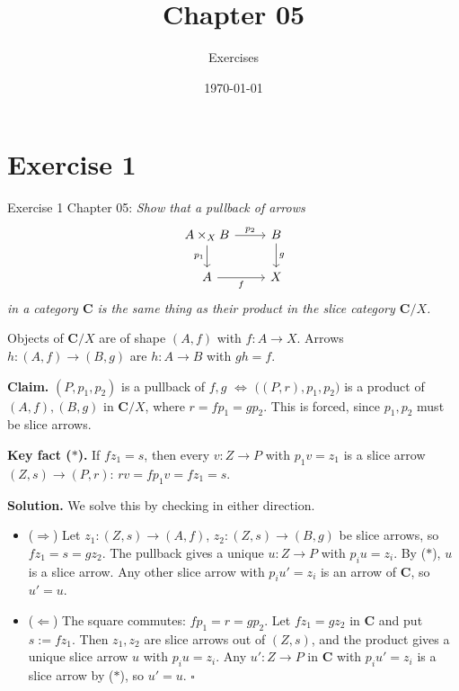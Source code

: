 \documentclass[11pt]{article}
\title{Chapter 05}
\author{Exercises}
\date{\today}
\begin{document}
\maketitle

\section{Exercise 1}

Exercise 1 Chapter 05: \textit{
  Show that a pullback of arrows
}
\[
\begin{tikzcd}
  A \times_{X} B \ar[r, "p_2"] \ar[d, "p_1"'] & B \ar[d, "g"] \\
  A \ar[r, "f"'] & X
\end{tikzcd}
\]
\textit{
in a category $\mathbf{C}$ is the same thing as their product in the slice
category $\mathbf{C}/X$.
}

\medskip

Objects of $\mathbf{C}/X$ are of shape $(A,f)$ with $f : A \to X$. Arrows
$h : (A,f) \to (B,g)$ are $h : A \to B$ with $g h = f$.

\textbf{Claim.} $(P,p_1,p_2)$ is a pullback of $f, g$ $\Leftrightarrow$
$\bigl((P,r),p_1,p_2\bigr)$ is a product of $(A,f), (B,g)$ in $\mathbf{C}/X$,
where $r = f p_1 = g p_2$. This is forced, since $p_1, p_2$ must be slice
arrows.

\textbf{Key fact ($\ast$).} If $f z_1 = s$, then every $v : Z \to P$ with
$p_1 v = z_1$ is a slice arrow $(Z,s) \to (P,r)$:
$r v = f p_1 v = f z_1 = s$.

\textbf{Solution.} We solve this by checking in either direction.

\begin{itemize}
  \item ($\Rightarrow$)
    Let $z_1 : (Z,s) \to (A,f)$, $z_2 : (Z,s) \to (B,g)$ be slice arrows, so
    $f z_1 = s = g z_2$. The pullback gives a unique $u : Z \to P$ with
    $p_i u = z_i$. By ($\ast$), $u$ is a slice arrow. Any other slice arrow
    with $p_i u' = z_i$ is an arrow of $\mathbf{C}$, so $u' = u$.
  \item ($\Leftarrow$)
    The square commutes: $f p_1 = r = g p_2$. Let $f z_1 = g z_2$ in
    $\mathbf{C}$ and put $s := f z_1$. Then $z_1, z_2$ are slice arrows out of
    $(Z,s)$, and the product gives a unique slice arrow $u$ with $p_i u = z_i$.
    Any $u' : Z \to P$ in $\mathbf{C}$ with $p_i u' = z_i$ is a slice arrow by
    ($\ast$), so $u' = u$. \hfill$\square$
\end{itemize}
\end{document}
